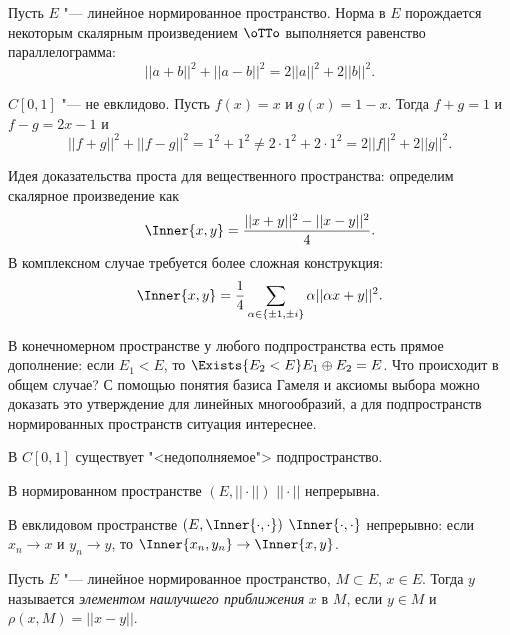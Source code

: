 \documentclass[main]{subfiles}
\begin{document}
\begin{theorem}[б/д]
  Пусть \( E \) "--- линейное нормированное пространство.
  Норма в \( E \) порождается некоторым
  скалярным произведением \( \oTTo \) выполняется
  равенство
  параллелограмма:
  \[ ||a + b||^2 + ||a - b||^2 = 2||a||^2 + 2||b||^2. \]
\end{theorem}

\begin{example}
  \( C[0, 1] \) "--- не евклидово.
  Пусть \( f(x) = x \) и \( g(x) = 1 - x \).
  Тогда \( f + g = 1 \) и \( f - g = 2x - 1 \) и
  \[ ||f + g||^2 + ||f - g||^2 = 1^2 + 1^2 \ne 2 \cdot 1^2 + 2 \cdot 1^2 =
  2 ||f||^2 + 2||g||^2. \]
\end{example}

Идея доказательства проста для вещественного пространства:
определим скалярное произведение как
\[ \Inner{x, y} = \frac{||x + y||^2 - ||x - y||^2}{4}. \]
В комплексном случае требуется более сложная конструкция:
\[ \Inner{x, y} = \frac{1}{4} \sum_{\alpha \in \{ \pm 1, \pm i \}}
\alpha ||\alpha x + y||^2. \]

В конечномерном пространстве
у любого подпространства есть прямое дополнение:
если \( E_1 < E \), то \( \Exists{E_2 < E} E_1 \oplus E_2 = E \).
Что происходит в общем случае?
С помощью понятия базиса Гамеля и аксиомы выбора
можно доказать это утверждение для линейных многообразий,
а для подпространств нормированных пространств ситуация интереснее.

\begin{problem}
  В \( C[0, 1] \) существует "<недополняемое"> подпространство.
\end{problem}

\begin{exercise}
  В нормированном пространстве \( (E, ||\cdot||) \)
  \( || \cdot || \) непрерывна.
\end{exercise}

\begin{exercise}
  В евклидовом пространстве \( (E, \Inner{\cdot, \cdot}) \)
  \( \Inner{\cdot, \cdot} \) непрерывно:
  если \( x_n \to x \) и \( y_n \to y \),
  то \( \Inner{x_n, y_n} \to \Inner{x, y} \).
\end{exercise}

\begin{definition}
  Пусть \( E \) "--- линейное нормированное пространство,
  \( M \subset E \),
  \( x \in E \). Тогда \( y \) называется 
  \emph{элементом наилучшего приближения}
  \( x \) в \( M \), если
  \( y \in M \) и \( \rho(x, M) = ||x - y|| \).
\end{definition}
\end{document}
